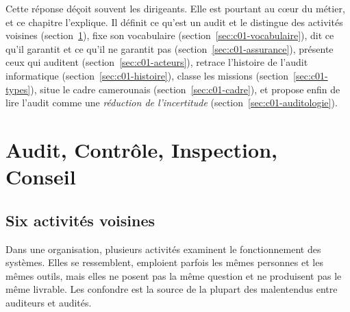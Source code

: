 Cette réponse déçoit souvent les dirigeants. Elle est pourtant au cœur du
métier, et ce chapitre l'explique. Il définit ce qu'est un audit et le
distingue des activités voisines (section~\ref{sec:c01-notions}), fixe son
vocabulaire (section~\ref{sec:c01-vocabulaire}), dit ce qu'il garantit et ce
qu'il ne garantit pas (section~\ref{sec:c01-assurance}), présente ceux qui
auditent (section~\ref{sec:c01-acteurs}), retrace l'histoire de l'audit
informatique (section~\ref{sec:c01-histoire}), classe les missions
(section~\ref{sec:c01-types}), situe le cadre camerounais
(section~\ref{sec:c01-cadre}), et propose enfin de lire l'audit comme une
\emph{réduction de l'incertitude} (section~\ref{sec:c01-auditologie}).

\separateur

\section{Audit, Contrôle, Inspection, Conseil}
\label{sec:c01-notions}

\subsection{Six activités voisines}

Dans une organisation, plusieurs activités examinent le fonctionnement des
systèmes. Elles se ressemblent, emploient parfois les mêmes personnes et
les mêmes outils, mais elles ne posent pas la même question et ne
produisent pas le même livrable. Les confondre est la source de la plupart
des malentendus entre auditeurs et audités.

